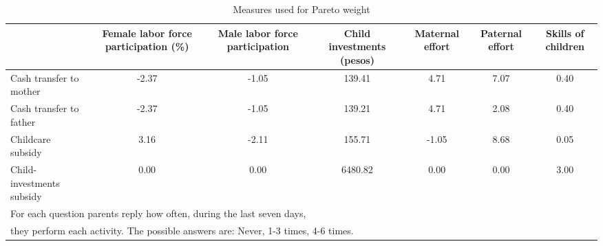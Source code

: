 \begin{table}[H]
\centering
\begingroup\footnotesize
\begin{tabular}{lcccccc}
  \hline
 & Female labor force participation (\%) & Male labor force participation & Child investments (pesos) & Maternal effort & Paternal effort & Skills of children \\ 
  \hline
Cash transfer to mother & -2.37 & -1.05 & 139.41 & 4.71 & 7.07 & 0.40 \\ 
  Cash transfer to father & -2.37 & -1.05 & 139.21 & 4.71 & 2.08 & 0.40 \\ 
  Childcare subsidy & 3.16 & -2.11 & 155.71 & -1.05 & 8.68 & 0.05 \\ 
  Child-investments subsidy & 0.00 & 0.00 & 6480.82 & 0.00 & 0.00 & 3.00 \\ 
   \hline 
\multicolumn{6}{l}{For each question parents reply how often, during the last seven days, }\\ 
\multicolumn{6}{l}{they perform each activity. The possible answers are: Never, 1-3 times, 4-6 times.} 
\end{tabular}
\endgroup
\caption{Measures used for Pareto weight} 
\label{tab:TableMeasuresBarg}
\end{table}

